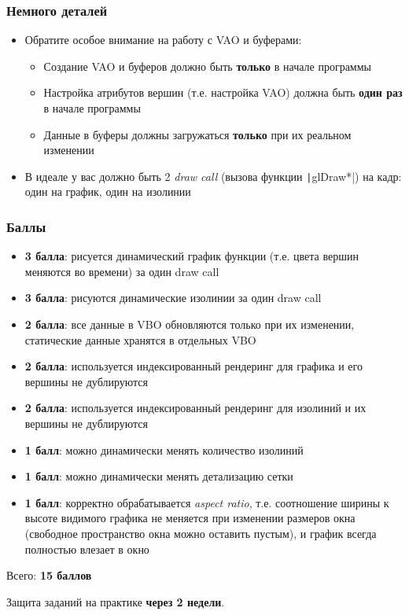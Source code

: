 \documentclass[10pt]{beamer}
\begin{document}
\begin{frame}[fragile]
\frametitle{Немного деталей}
\begin{itemize}
\item Обратите особое внимание на работу с VAO и буферами:
\begin{itemize}
\item Создание VAO и буферов должно быть \textbf{только} в начале программы
\item Настройка атрибутов вершин (т.е. настройка VAO) должна быть \textbf{один раз} в начале программы
\item Данные в буферы должны загружаться \textbf{только} при их реальном изменении
\end{itemize}
\pause
\item В идеале у вас должно быть 2 \textit{draw call} (вызова функции \texttt|glDraw*|) на кадр: один на график, один на изолинии
\end{itemize}
\end{frame}

\begin{frame}[fragile]
\frametitle{Баллы}
\footnotesize
\begin{itemize}
\item \textbf{3 балла}: рисуется динамический график функции (т.е. цвета вершин меняются во времени) за один draw call
\item \textbf{3 балла}: рисуются динамические изолинии за один draw call
\item \textbf{2 балла}: все данные в VBO обновляются только при их изменении, статические данные хранятся в отдельных VBO
\item \textbf{2 балла}: используется индексированный рендеринг для графика и его вершины не дублируются
\item \textbf{2 балла}: используется индексированный рендеринг для изолиний и их вершины не дублируются
\item \textbf{1 балл}:  можно динамически менять количество изолиний
\item \textbf{1 балл}:  можно динамически менять детализацию сетки
\item \textbf{1 балл}:  корректно обрабатывается \textit{aspect ratio}, т.е. соотношение ширины к высоте видимого графика не меняется при изменении размеров окна (свободное пространство окна можно оставить пустым), и график всегда полностью влезает в окно
\end{itemize}
Всего: \textbf{15 баллов}

Защита заданий на практике \textbf{через 2 недели}.
\end{frame}
\end{document}
